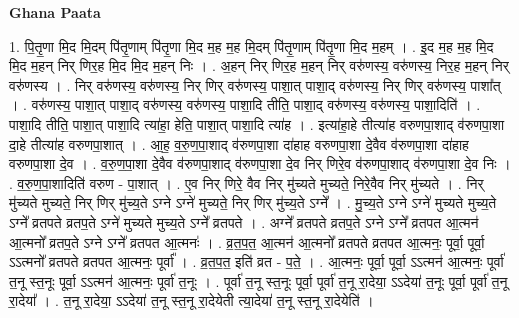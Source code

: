 \documentclass[17pt]{extarticle}
\begin{document}
\textbf{Ghana Paata } \newline

1. पि॒तृ॒णा मि॒द मि॒दम् पि॑तृ॒णाम् पि॑तृ॒णा मि॒द म॒ह म॒ह मि॒दम् पि॑तृ॒णाम् पि॑तृ॒णा मि॒द म॒हम् । . इ॒द म॒ह म॒ह मि॒द मि॒द म॒हन् निर् णिर॒ह मि॒द मि॒द म॒हन् निः । . अ॒हन् निर् णिर॒ह म॒हन् निर् वरु॑णस्य॒ वरु॑णस्य॒ निर॒ह म॒हन् निर् वरु॑णस्य । . निर् वरु॑णस्य॒ वरु॑णस्य॒ निर् णिर् वरु॑णस्य॒ पाशा॒त् पाशा॒द् वरु॑णस्य॒ निर् णिर् वरु॑णस्य॒ पाशा᳚त् । . वरु॑णस्य॒ पाशा॒त् पाशा॒द् वरु॑णस्य॒ वरु॑णस्य॒ पाशा॒दि तीति॒ पाशा॒द् वरु॑णस्य॒ वरु॑णस्य॒ पाशा॒दिति॑ । . पाशा॒दि तीति॒ पाशा॒त् पाशा॒दि त्या॑हा॒ हेति॒ पाशा॒त् पाशा॒दि त्या॑ह । . इत्या॑हा॒हे तीत्या॑ह वरुणपा॒शाद् व॑रुणपा॒शा दा॒हे तीत्या॑ह वरुणपा॒शात् । . आ॒ह॒ व॒रु॒ण॒पा॒शाद् व॑रुणपा॒शा दा॑हाह वरुणपा॒शा दे॒वैव व॑रुणपा॒शा दा॑हाह वरुणपा॒शा दे॒व । . व॒रु॒ण॒पा॒शा दे॒वैव व॑रुणपा॒शाद् व॑रुणपा॒शा दे॒व निर् णिरे॒व व॑रुणपा॒शाद् व॑रुणपा॒शा दे॒व निः । . व॒रु॒ण॒पा॒शादिति॑ वरुण - पा॒शात् । . ए॒व निर् णिरे॒ वैव निर् मु॑च्यते मुच्यते॒ निरे॒वैव निर् मु॑च्यते । . निर् मु॑च्यते मुच्यते॒ निर् णिर् मु॑च्य॒ते ऽग्ने ऽग्ने॑ मुच्यते॒ निर् णिर् मु॑च्य॒ते ऽग्ने᳚ । . मु॒च्य॒ते ऽग्ने ऽग्ने॑ मुच्यते मुच्य॒ते ऽग्ने᳚ व्रतपते व्रतप॒ते ऽग्ने॑ मुच्यते मुच्य॒ते ऽग्ने᳚ व्रतपते । . अग्ने᳚ व्रतपते व्रतप॒ते ऽग्ने ऽग्ने᳚ व्रतपत आ॒त्मन॑ आ॒त्मनो᳚ व्रतप॒ते ऽग्ने ऽग्ने᳚ व्रतपत आ॒त्मनः॑ । . व्र॒त॒प॒त॒ आ॒त्मन॑ आ॒त्मनो᳚ व्रतपते व्रतपत आ॒त्मनः॒ पूर्वा॒ पूर्वा॒ ऽऽत्मनो᳚ व्रतपते व्रतपत आ॒त्मनः॒ पूर्वा᳚ । . व्र॒त॒प॒त॒ इति॑ व्रत - प॒ते॒ । . आ॒त्मनः॒ पूर्वा॒ पूर्वा॒ ऽऽत्मन॑ आ॒त्मनः॒ पूर्वा॑ त॒नू स्त॒नूः पूर्वा॒ ऽऽत्मन॑ आ॒त्मनः॒ पूर्वा॑ त॒नूः । . पूर्वा॑ त॒नू स्त॒नूः पूर्वा॒ पूर्वा॑ त॒नू रा॒देया॒ ऽऽदेया॑ त॒नूः पूर्वा॒ पूर्वा॑ त॒नू रा॒देया᳚ । . त॒नू रा॒देया॒ ऽऽदेया॑ त॒नू स्त॒नू रा॒देयेती त्या॒देया॑ त॒नू स्त॒नू रा॒देयेति॑ । \newline
\end{document}
